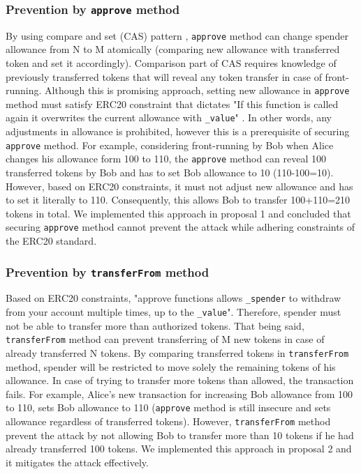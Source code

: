 \subsubsection*{Prevention by \texttt{approve} method} By using compare and set (CAS) pattern \cite{Ref06}, \texttt{approve} method can change spender allowance from N to M atomically (\ie comparing new allowance with transferred token and set it accordingly). Comparison part of CAS requires knowledge of previously transferred tokens that will reveal any token transfer in case of front-running. Although this is promising approach,  setting new allowance in \texttt{approve} method must satisfy ERC20 constraint that dictates "If this function is called again it overwrites the current allowance with \texttt{\_value}" \cite{Ref08}. In other words, any adjustments in allowance is prohibited, however this is a prerequisite of securing \texttt{approve} method. 
For example, considering front-running by Bob when Alice changes his allowance form 100 to 110, the \texttt{approve} method can reveal 100 transferred tokens by Bob and has to set Bob allowance to 10 (110-100=10). However, based on ERC20 constraints, it must not adjust new allowance and has to set it literally to 110. Consequently, this allows Bob to transfer 100+110=210 tokens in total. We implemented this approach in proposal 1 and concluded that securing \texttt{approve} method cannot prevent the attack while adhering constraints of the ERC20 standard.
	
\subsubsection*{Prevention by \texttt{transferFrom} method} Based on ERC20 constraints, "approve functions allows \texttt{\_spender} to withdraw from your account multiple times, up to the \texttt{\_value}". Therefore, spender must not be able to transfer more than authorized tokens. That being said, \texttt{transferFrom} method can prevent transferring of M new tokens in case of already transferred N tokens. By comparing transferred tokens in \texttt{transferFrom} method, spender will be restricted to move solely the remaining tokens of his allowance. In case of trying to transfer more tokens than allowed, the transaction fails. For example, Alice's new transaction for increasing Bob allowance from 100 to 110, sets Bob allowance to 110 (\texttt{approve} method is still insecure and sets allowance regardless of transferred tokens). However, \texttt{transferFrom} method prevent the attack by not allowing Bob to transfer more than 10 tokens if he had already transferred 100 tokens. We implemented this approach in proposal 2 and it mitigates the attack effectively.


